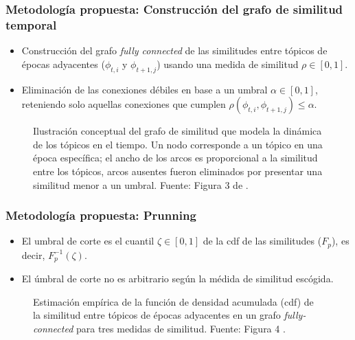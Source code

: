 \documentclass[
	spanish, %
	aspectratio=43, %
	hyperref={pdfencoding=auto,psdextra},
	xcolor={dvipsnames,table,usenames},
]{beamer}
\begin{document}
\begin{frame}[t]
\frametitle{Metodología propuesta: Construcción del grafo de similitud temporal}
\begin{itemize}
  \item Construcción del grafo \textit{fully connected} de las similitudes entre tópicos de épocas adyacentes ($\phi_{t,i}$ y $\phi_{t+1,j}$) usando una medida de similitud $\rho \in [0,1]$.
  \item Eliminación de las conexiones débiles en base a un umbral $\alpha \in [0,1]$, reteniendo solo aquellas conexiones que cumplen $\rho(\phi_{t,i}, \phi_{t+1,j})\leq \alpha$.
\end{itemize}

\vspace*{-0.3in}
\begin{figure}
\caption{Ilustración conceptual del grafo de similitud que modela la dinámica de los tópicos en el tiempo. Un nodo corresponde a un tópico en una época específica; el ancho de los arcos es proporcional a la similitud entre los tópicos, arcos ausentes fueron eliminados por presentar una similitud menor a un umbral. Fuente:  Figura 3 de \cite{beykikhoshk2018discovering}.}
\label{img:graph}
\end{figure}		

\end{frame}


\begin{frame}[t]
\frametitle{Metodología propuesta: Prunning}

\begin{itemize}
  \item El umbral de corte es el cuantil $\zeta \in [0,1]$ de la cdf de las similitudes ($F_{p}$), es decir, $F_{p}^{-1}(\zeta)$.
  \item El úmbral de corte no es arbitrario según la médida de similitud escógida.
\end{itemize}

\vspace*{-0.3in}
\begin{figure}
  \caption{Estimación empírica de la función de densidad acumulada (cdf) de la similitud entre tópicos de épocas adyacentes en un grafo \textit{fully-connected} para tres medidas de similitud. Fuente: Figura 4 \cite{beykikhoshk2018discovering}.}
  \label{img:cdf_sim}
\end{figure}

\end{frame}
\end{document}
